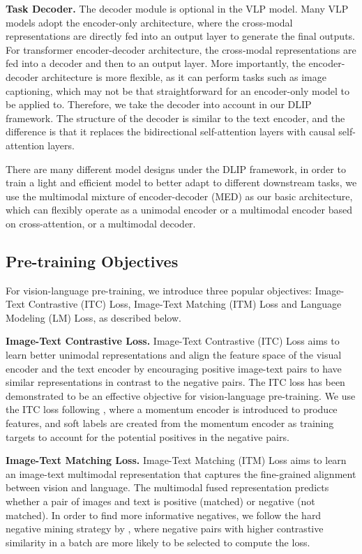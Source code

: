 \documentclass[10pt,twocolumn,letterpaper]{article}
\begin{document}
\par
\noindent
\textbf{Task Decoder.}
The decoder module is optional in the VLP model. 
Many VLP models adopt the encoder-only architecture, where the cross-modal representations are directly fed into an output layer to generate the final outputs.
For transformer encoder-decoder architecture, the cross-modal representations are fed into a decoder and then to an output layer. 
More importantly, the encoder-decoder architecture is more flexible, as it can perform tasks such as image captioning, which may not be that straightforward for an encoder-only model to be applied to. Therefore, we take the decoder into account in our DLIP framework. 
The structure of the decoder is similar to the text encoder, and the difference is that it replaces the bidirectional self-attention layers with causal self-attention layers.

 There are many different model designs under the DLIP framework, in order to train a light and efficient model to better adapt to different downstream tasks, we use the multimodal mixture of encoder-decoder (MED) \cite{li2022blip} as our basic architecture, which can flexibly operate as a unimodal encoder or a multimodal encoder based on cross-attention, or a multimodal decoder.

\subsection{Pre-training Objectives}
For vision-language pre-training, we introduce three popular objectives: Image-Text Contrastive (ITC) Loss, Image-Text Matching (ITM) Loss and Language Modeling (LM) Loss, as described below.

\vspace{0.4em}
\par
\noindent
\textbf{Image-Text Contrastive Loss.}
Image-Text Contrastive (ITC) Loss aims to learn better unimodal representations and align the feature space of the visual encoder and the text encoder by encouraging positive image-text pairs to have similar representations in contrast to the negative pairs. 
The ITC loss has been demonstrated to be an effective objective for vision-language pre-training. 
We use the ITC loss following \cite{li2021align, li2022blip}, where a momentum encoder is introduced to produce features, and soft labels are created from the momentum encoder as training targets to account for the potential positives in the negative pairs.


\vspace{0.4em}
\par
\noindent
\textbf{Image-Text Matching Loss.}
Image-Text Matching (ITM) Loss aims to learn an image-text multimodal representation that captures the fine-grained alignment between vision and language. The multimodal fused representation predicts whether a pair of images and text is positive (matched) or negative (not matched). 
In order to find more informative negatives, we follow the hard negative mining strategy by  \cite{li2021align, li2022blip}, where negative pairs with higher contrastive similarity in a batch are more likely to be selected to compute the loss.
\end{document}

